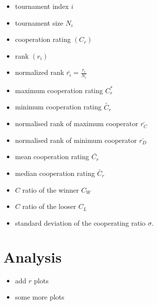 \documentclass{article}
\begin{document}
\begin{multicols}{2}
    \begin{itemize}
        \item tournament index \(i\)
        \item tournament size \(N_{i}\)
        \item cooperation rating \((C_{r})\)
        \item rank \((r_{i})\)
        \item normalized rank \(\bar{r_{i}} = \frac{r_{i}}{N_{i}}\)
        \item maximum cooperation rating \(C^{*}_{r}\)
        \item minimum cooperation rating  \(\tilde{C_{r}}\)
        \item normalised rank of maximum cooperator \(\bar{r_{C}}\)
        \item normalised rank of minimum cooperator \(\bar{r_{D}}\)
        \item mean cooperation rating \(\bar{C_{r}}\)
        \item median cooperation rating \(\breve{C_{r}}\)
        \item \(C\) ratio of the winner \(C_{W}\)
        \item \(C\) ratio of the looser \(C_{L}\)
        \item standard deviation of the cooperating ratio \(\sigma\).
    \end{itemize}
    \end{multicols}

\section{Analysis}

\begin{itemize}
\item add \(r\) plots
\item some more plots
\end{itemize}
\end{document}
